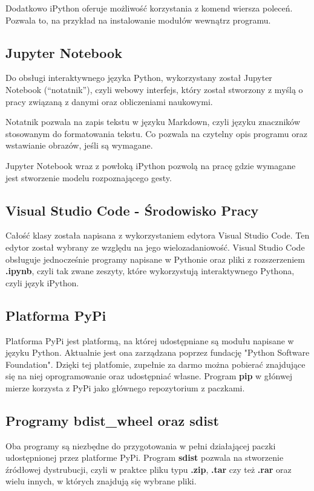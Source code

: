 \quad Dodatkowo iPython oferuje możliwość korzystania z komend wiersza poleceń. Pozwala to, na przykład na instalowanie modułów wewnątrz programu. 

\subsection{Jupyter Notebook}

\quad Do obsługi interaktywnego języka Python, wykorzystany został Jupyter Notebook (\enquote{notatnik}), czyli webowy interfejs, który został stworzony z myślą o pracy związaną z danymi oraz obliczeniami naukowymi. 

\quad Notatnik pozwala na zapis tekstu w języku Markdown, czyli języku znaczników stosowanym do formatowania tekstu. Co pozwala na czytelny opis programu oraz wstawianie obrazów, jeśli są wymagane. 

\quad Jupyter Notebook wraz z powłoką iPython pozwolą na pracę gdzie wymagane jest stworzenie modelu rozpoznającego gesty. 

\subsection{Visual Studio Code - Środowisko Pracy}
\quad Całość klasy została napisana z wykorzystaniem edytora Visual Studio Code. Ten edytor został wybrany ze względu na jego wielozadaniowość. Visual Studio Code obsługuje jednocześnie programy napisane w Pythonie oraz pliki z rozszerzeniem \textbf{.ipynb}, czyli tak zwane zeszyty, które wykorzystują interaktywnego Pythona, czyli język iPython. 

\subsection{Platforma PyPi}
\quad Platforma PyPi jest platformą, na której udostępniane są modułu napisane w języku Python. Aktualnie jest ona zarządzana poprzez fundację "Python Software Foundation". Dzięki tej platfomie, zupełnie za darmo można pobierać znajdujące się na niej oprogramowanie oraz udostępniać własne. Program \textbf{pip} w głónwej mierze korzysta z PyPi jako głównego repozytorium z paczkami. 

\subsection{Programy bdist\_wheel oraz sdist}
\quad Oba programy są niezbędne do przygotowania w pełni działającej paczki udostępnionej przez platforme PyPi. Program \textbf{sdist} pozwala na stworzenie źródłowej dystrubucji, czyli w praktce pliku typu \textbf{.zip}, \textbf{.tar} czy też \textbf{.rar} oraz wielu innych, w których znajdują się wybrane pliki. 

